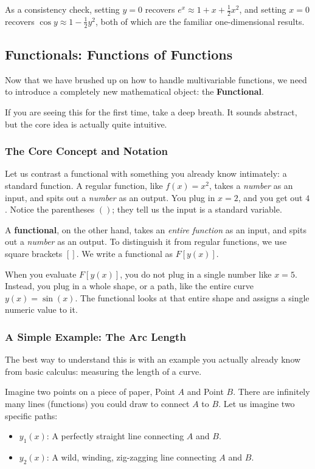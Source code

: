 \documentclass{article}
\begin{document}
	\noindent As a consistency check, setting $y=0$ recovers $e^x\approx
	1+x+\tfrac{1}{2}x^2$, and setting $x=0$ recovers $\cos y\approx
	1-\tfrac{1}{2}y^2$, both of which are the familiar one-dimensional results.
	
	
	\subsection{Functionals: Functions of Functions}
	Now that we have brushed up on how to handle multivariable functions, we need to introduce a completely new mathematical object: the \textbf{Functional}. 
	
	If you are seeing this for the first time, take a deep breath. It sounds abstract, but the core idea is actually quite intuitive. 
	
	\subsubsection*{The Core Concept and Notation}
	Let us contrast a functional with something you already know intimately: a standard function. 
	A regular function, like $f(x) = x^2$, takes a \textit{number} as an input, and spits out a \textit{number} as an output. You plug in $x=2$, and you get out $4$. Notice the parentheses $()$; they tell us the input is a standard variable.
	
	A \textbf{functional}, on the other hand, takes an \textit{entire function} as an input, and spits out a \textit{number} as an output. 
	To distinguish it from regular functions, we use square brackets $[]$. We write a functional as $F[y(x)]$. 
	
	When you evaluate $F[y(x)]$, you do not plug in a single number like $x=5$. Instead, you plug in a whole shape, or a path, like the entire curve $y(x) = \sin(x)$. The functional looks at that entire shape and assigns a single numeric value to it. 
	
	\subsubsection*{A Simple Example: The Arc Length}
	The best way to understand this is with an example you actually already know from basic calculus: measuring the length of a curve.
	
	Imagine two points on a piece of paper, Point $A$ and Point $B$. There are infinitely many lines (functions) you could draw to connect $A$ to $B$. 
	Let us imagine two specific paths:
	\begin{itemize}
		\item $y_1(x)$: A perfectly straight line connecting $A$ and $B$.
		\item $y_2(x)$: A wild, winding, zig-zagging line connecting $A$ and $B$.
	\end{itemize}
	
\end{document}
